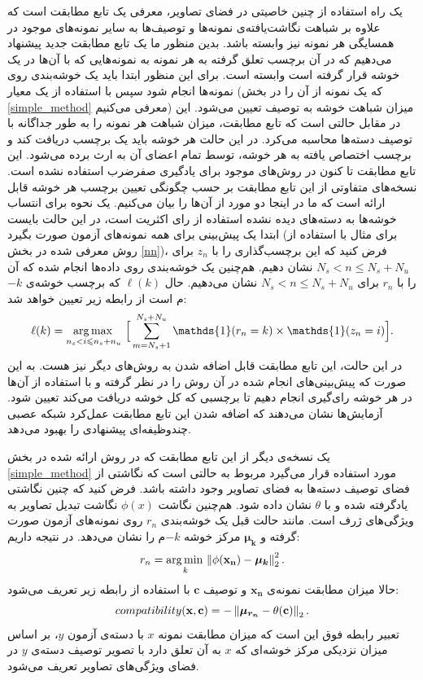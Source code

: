 یک راه استفاده از چنین خاصیتی در فضای تصاویر، معرفی یک تابع مطابقت است که علاوه بر شباهت نگاشت‌یافته‌ی نمونه‌ها و توصیف‌ها به سایر نمونه‌های موجود در همسایگی هر نمونه نیز وابسته باشد. بدین منظور ما یک تابع مطابقت جدید پیشنهاد می‌دهیم که در آن برچسب تعلق گرفته به هر نمونه به نمونه‌هایی
 که با آن‌ها در یک خوشه قرار گرفته است وابسته است. برای این منظور ابتدا باید یک خوشه‌بندی روی نمونه‌ها انجام شود سپس با استفاده از یک معیار (که یک نمونه از آن را در بخش \ref{simple_method} معرفی می‌کنیم) میزان شباهت خوشه به توصیف تعیین می‌شود. این در مقابل حالتی است که تابع مطابقت، میزان شباهت هر نمونه را به طور جداگانه با توصیف دسته‌ها محاسبه می‌کرد.  در این حالت هر خوشه باید یک برچسب دریافت کند و برچسب اختصاص یافته به هر خوشه، توسط تمام اعضای آن به ارث برده می‌شود. این تابع مطابقت تا کنون در روش‌های موجود برای یادگیری صفرضرب استفاده نشده است. نسخه‌های متفاوتی از این تابع مطابقت بر حسب چگونگی تعیین برچسب هر خوشه قابل ارائه است که ما در اینجا دو مورد از آن‌ها را بیان می‌کنیم.
یک نحوه برای انتساب خوشه‌ها به دسته‌های دیده نشده استفاده از رای اکثریت است، در این حالت بایست ابتدا یک پیش‌بینی برای همه نمونه‌های آزمون صورت بگیرد (برای مثال با استفاده از روش معرفی شده در بخش \ref{nn})، فرض کنید که این برچسب‌گذاری را با
$z_n$
برای
 $N_s < n \leq N_s + N_u$
نشان دهیم. هم‌چنین یک خوشه‌بندی روی داده‌ها انجام شده که آن را با
$r_n$ برای
$N_s < n \leq N_s + N_u$
نشان می‌دهیم. حال   $\ell(k)$ که برچسب خوشه‌ی $-k$م است از رابطه زیر تعیین خواهد شد:
\begin{equation}
\label{eq:voting}
\ell(k) = \argmax_{n_s < i \leq n_s + n_u} \, \Big [ \sum_{m=N_s+1}^{N_s+N_u} \mathds{1}(r_n = k) \times \mathds{1}(z_n = i) \Big ].
\end{equation}
در این حالت،
 این تابع مطابقت قابل اضافه شدن به روش‌های دیگر نیز هست. به این صورت که پیش‌بینی‌های انجام شده در آن روش را در نظر گرفته و با استفاده از آن‌ها در هر خوشه رای‌گیری انجام دهیم تا برچسبی که کل خوشه دریافت می‌کند تعیین شود. آزمایش‌ها نشان می‌دهند که  اضافه شدن این تابع مطابقت عمل‌کرد شبکه عصبی چندوظیفه‌ای پیشنهادی را بهبود می‌دهد.

 یک نسخه‌ی دیگر از این تابع مطابقت که در روش ارائه شده در بخش \ref{simple_method} مورد استفاده قرار می‌گیرد مربوط به حالتی است که نگاشتی از فضای توصیف دسته‌ها به فضای تصاویر وجود داشته باشد. فرض کنید که چنین نگاشتی یادگرفته شده و با $\theta$ نشان داده شود. هم‌چنین نگاشت
 $\phi(x)$
  نگاشت تبدیل تصاویر به ویژگی‌های ژرف است. مانند حالت قبل یک خوشه‌بندی $r_n$ روی نمونه‌های آزمون صورت گرفته و
   $\boldsymbol{\mu_k} $
    مرکز خوشه $-k$م را نشان می‌دهد. در نتیجه داریم:
 \begin{equation}
 r_n = \operatorname*{arg\,min\,}_{k} \left \lVert \phi(\mathbf{x_n}) - \boldsymbol{\mu_k} \right \rVert_2^2.
 \end{equation}
 حالا میزان مطابقت نمونه‌ی $\mathbf{x_n} $ و توصیف $\mathbf{c} $ با استفاده از رابطه زیر تعریف می‌شود:
 \begin{equation}
 compatibility(\mathbf{x,c}) = - \left \lVert \boldsymbol{\mu_{r_n}} -  \theta(\mathbf{c}) \right \rVert_2.
 \end{equation}
 تعبیر رابطه فوق این است که میزان مطابقت نمونه $x$ با دسته‌ی آزمون $y$، بر اساس میزان نزدیکی مرکز خوشه‌ای که $x$ به آن تعلق دارد با تصویر توصیف دسته‌ی $y$ در فضای ویژگی‌های تصاویر تعریف می‌شود.


